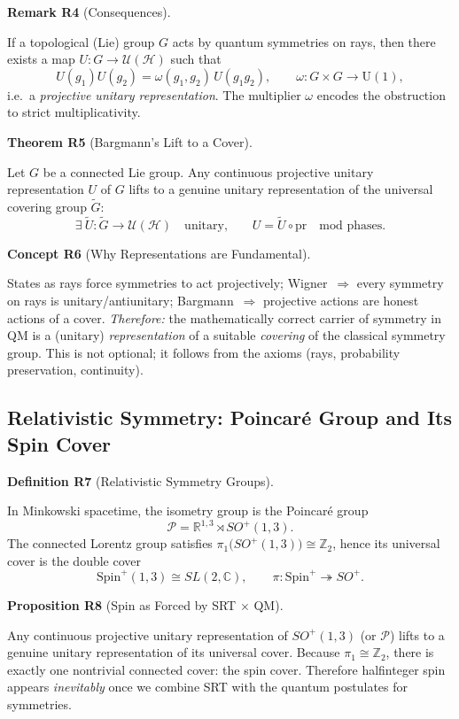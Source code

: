 \documentclass[10pt, letterpaper]{article}
\newcommand{\R}{\mathbb{R}}
\newcommand{\Z}{\mathbb{Z}}
\newcommand{\C}{\mathbb{C}}
\newcommand{\Spin}{\mathrm{Spin}}
\newcommand{\U}{\mathrm{U}}
\newcommand{\CustomHeading}[3]{%
  \par\medskip\noindent%
  \textbf{#1 #2} \textnormal{(#3)}.\enskip%
}
\newenvironment{DEF}[2]{\begin{unitbox}\CustomHeading{Definition}{#1}{#2}}{\end{unitbox}}
\newenvironment{PROP}[2]{\begin{unitbox}\CustomHeading{Proposition}{#1}{#2}}{\end{unitbox}}
\newenvironment{THEO}[2]{\begin{unitbox}\CustomHeading{Theorem}{#1}{#2}}{\end{unitbox}}
\newenvironment{REM}[2]{\begin{unitbox}\CustomHeading{Remark}{#1}{#2}}{\end{unitbox}}
\newenvironment{CONC}[2]{\begin{unitbox}\CustomHeading{Concept}{#1}{#2}}{\end{unitbox}}
\begin{document}
\begin{REM}{R4}{Consequences}
If a topological (Lie) group $G$ acts by quantum symmetries on rays, then there exists a map $U:G\to\mathcal U(\mathcal H)$ such that
\[
U(g_1)U(g_2)=\omega(g_1,g_2)\,U(g_1g_2),
\qquad \omega:G\times G\to \U(1),
\]
i.e.\ a \emph{projective unitary representation}. The multiplier $\omega$ encodes the obstruction to strict multiplicativity.
\end{REM}

\begin{THEO}{R5}{Bargmann’s Lift to a Cover}
Let $G$ be a connected Lie group. Any continuous projective unitary representation $U$ of $G$ lifts to a genuine unitary representation of the universal covering group $\widetilde G$:
\[
\exists\ \widetilde U:\widetilde G\to\mathcal U(\mathcal H)\quad\text{unitary,}\qquad
U = \widetilde U\circ \mathrm{pr}\quad\text{mod phases}.
\]
\end{THEO}

\begin{CONC}{R6}{Why Representations are Fundamental}
States as rays force symmetries to act projectively; Wigner~$\Rightarrow$ every symmetry on rays is unitary/antiunitary; Bargmann~$\Rightarrow$ projective actions are honest actions of a cover.  
\emph{Therefore:} the mathematically correct carrier of symmetry in QM is a (unitary) \emph{representation} of a suitable \emph{covering} of the classical symmetry group. This is not optional; it follows from the axioms (rays, probability preservation, continuity).
\end{CONC}

\subsection{Relativistic Symmetry: Poincaré Group and Its Spin Cover}

\begin{DEF}{R7}{Relativistic Symmetry Groups}
In Minkowski spacetime, the isometry group is the Poincaré group
\[
\mathcal P=\R^{1,3}\rtimes SO^+(1,3).
\]
The connected Lorentz group satisfies $\pi_1\big(SO^+(1,3)\big)\cong \Z_2$, hence its universal cover is the double cover
\[
\Spin^+(1,3)\cong SL(2,\C),\qquad \pi:\Spin^+\twoheadrightarrow SO^+.
\]
\end{DEF}

\begin{PROP}{R8}{Spin as Forced by SRT $\times$ QM}
Any continuous projective unitary representation of $SO^+(1,3)$ (or $\mathcal P$) lifts to a genuine unitary representation of its universal cover. Because $\pi_1\cong\Z_2$, there is exactly one nontrivial connected cover: the spin cover. Therefore halfinteger spin appears \emph{inevitably} once we combine SRT with the quantum postulates for symmetries.
\end{PROP}
\end{document}
